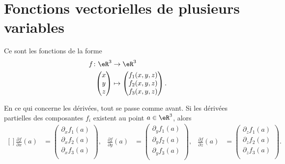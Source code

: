 \section{Fonctions vectorielles de plusieurs variables}

Ce sont les fonctions de la forme
\begin{equation}
	\begin{aligned}
		f\colon \eR^3   & \to \eR^3            \\
		\begin{pmatrix}
			x \\
			y \\
			z
		\end{pmatrix} & \mapsto \begin{pmatrix}
			                        f_1(x,y,z) \\
			                        f_2(x,y,z) \\
			                        f_3(x,y,z)
		                        \end{pmatrix}.
	\end{aligned}
\end{equation}

En ce qui concerne les dérivées, tout se passe comme avant. Si les dérivées partielles des composantes \( f_i\) existent au point \( a\in\eR^3\), alors
\begin{equation}
	\begin{aligned}[]
		\frac{ \partial f }{ \partial x }(a) & =\begin{pmatrix}
			                                        \partial_xf_1(a) \\
			                                        \partial_xf_2(a) \\
			                                        \partial_xf_3(a) \\
		                                        \end{pmatrix}, &
		\frac{ \partial f }{ \partial y }(a) & =\begin{pmatrix}
			                                        \partial_yf_1(a) \\
			                                        \partial_yf_2(a) \\
			                                        \partial_yf_3(a) \\
		                                        \end{pmatrix}, &
		\frac{ \partial f }{ \partial z }(a) & =\begin{pmatrix}
			                                        \partial_zf_1(a) \\
			                                        \partial_zf_2(a) \\
			                                        \partial_zf_3(a) \\
		                                        \end{pmatrix}.
	\end{aligned}
\end{equation}

